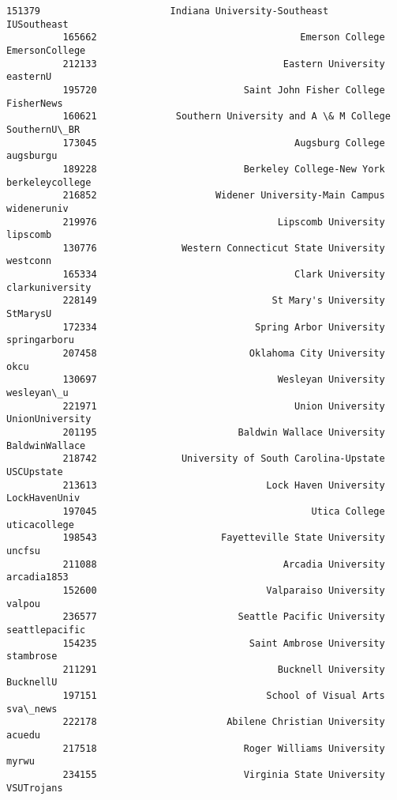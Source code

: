 \documentclass[11pt]{article}
\begin{document}
\begin{Verbatim}[commandchars=\\\{\}]
          151379                       Indiana University-Southeast      IUSoutheast   
          165662                                    Emerson College   EmersonCollege   
          212133                                 Eastern University         easternU   
          195720                          Saint John Fisher College       FisherNews   
          160621              Southern University and A \& M College     SouthernU\_BR   
          173045                                   Augsburg College        augsburgu   
          189228                          Berkeley College-New York  berkeleycollege   
          216852                     Widener University-Main Campus      wideneruniv   
          219976                                Lipscomb University         lipscomb   
          130776               Western Connecticut State University         westconn   
          165334                                   Clark University  clarkuniversity   
          228149                               St Mary's University         StMarysU   
          172334                            Spring Arbor University     springarboru   
          207458                           Oklahoma City University             okcu   
          130697                                Wesleyan University       wesleyan\_u   
          221971                                   Union University  UnionUniversity   
          201195                         Baldwin Wallace University   BaldwinWallace   
          218742               University of South Carolina-Upstate       USCUpstate   
          213613                              Lock Haven University    LockHavenUniv   
          197045                                      Utica College     uticacollege   
          198543                      Fayetteville State University           uncfsu   
          211088                                 Arcadia University      arcadia1853   
          152600                              Valparaiso University           valpou   
          236577                         Seattle Pacific University   seattlepacific   
          154235                           Saint Ambrose University        stambrose   
          211291                                Bucknell University        BucknellU   
          197151                              School of Visual Arts         sva\_news   
          222178                       Abilene Christian University           acuedu   
          217518                          Roger Williams University            myrwu   
          234155                          Virginia State University       VSUTrojans   

\end{Verbatim}
\end{document}
